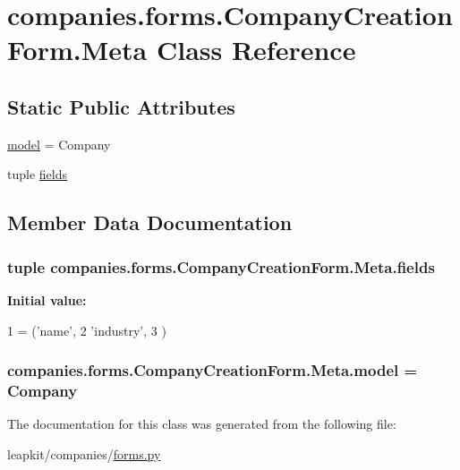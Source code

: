 \hypertarget{classcompanies_1_1forms_1_1_company_creation_form_1_1_meta}{\section{companies.\-forms.\-Company\-Creation\-Form.\-Meta Class Reference}
\label{classcompanies_1_1forms_1_1_company_creation_form_1_1_meta}
}
\subsection*{Static Public Attributes}
\begin{DoxyCompactItemize}
\item 
\hyperlink{classcompanies_1_1forms_1_1_company_creation_form_1_1_meta_a66afe0ce9e0d3543402c9eba18599396}{model} = Company
\item 
tuple \hyperlink{classcompanies_1_1forms_1_1_company_creation_form_1_1_meta_af023b1dedb78a29282a1b53c4fd37a6d}{fields}
\end{DoxyCompactItemize}


\subsection{Member Data Documentation}
\hypertarget{classcompanies_1_1forms_1_1_company_creation_form_1_1_meta_af023b1dedb78a29282a1b53c4fd37a6d}{
\subsubsection[{fields}]{\setlength{\rightskip}{0pt plus 5cm}tuple companies.\-forms.\-Company\-Creation\-Form.\-Meta.\-fields\hspace{0.3cm}{\ttfamily [static]}}}\label{classcompanies_1_1forms_1_1_company_creation_form_1_1_meta_af023b1dedb78a29282a1b53c4fd37a6d}
{\bfseries Initial value\-:}
\begin{DoxyCode}
1 = (\textcolor{stringliteral}{'name'},
2                   \textcolor{stringliteral}{'industry'},
3         )
\end{DoxyCode}
\hypertarget{classcompanies_1_1forms_1_1_company_creation_form_1_1_meta_a66afe0ce9e0d3543402c9eba18599396}{
\subsubsection[{model}]{\setlength{\rightskip}{0pt plus 5cm}companies.\-forms.\-Company\-Creation\-Form.\-Meta.\-model = Company\hspace{0.3cm}{\ttfamily [static]}}}\label{classcompanies_1_1forms_1_1_company_creation_form_1_1_meta_a66afe0ce9e0d3543402c9eba18599396}


The documentation for this class was generated from the following file\-:\begin{DoxyCompactItemize}
\item 
leapkit/companies/\hyperlink{companies_2forms_8py}{forms.\-py}\end{DoxyCompactItemize}
